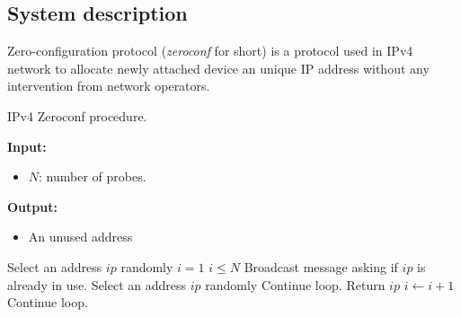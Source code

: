 \subsection{System description}
Zero-configuration protocol (\textit{zeroconf} for short) \cite{ZeroConf} is a protocol used in IPv4 network to
allocate newly attached device an unique IP address without any intervention from network operators.
\begin{algorithm}[H]
    \caption{IPv4 Zeroconf procedure.}
    \label{alg:gen-sir-ctmc}
    \hspace*{\algorithmicindent} \textbf{Input:}
    \begin{itemize}
        \item $N$: number of probes.
    \end{itemize}
    \hspace*{\algorithmicindent} \textbf{Output:}
    \begin{itemize}
        \item An unused address
    \end{itemize}
    \begin{algorithmic}[1]
        \State Select an address $ip$ randomly
        \State $i = 1$
        \While $i \leq N$
        \State Broadcast message asking if $ip$ is already in use.
        \State Select an address $ip$ randomly
        \State Continue loop.
        \EndIf
        \State Return $ip$
        \EndIf
        \State $i \leftarrow i + 1$
        \State Continue loop.
        \EndIf
        \EndWhile
        \EndProcedure
    \end{algorithmic}
\end{algorithm}

